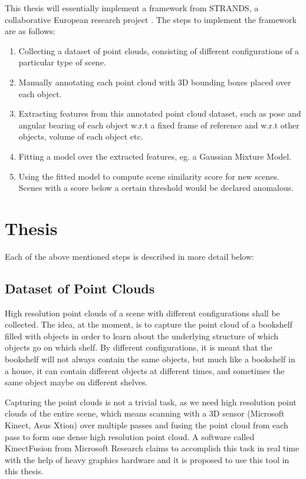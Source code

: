 \documentclass[12pt]{article}
\begin{document}
This thesis will essentially implement a framework from STRANDS, a collaborative European research project \cite{STRANDS}. The steps to implement the framework are as follows:

\begin{enumerate}
\item{Collecting a dataset of point clouds, consisting of different configurations of a particular type of scene.}
\item{Manually annotating each point cloud with 3D bounding boxes placed over each object.}
\item{Extracting features from this annotated point cloud dataset, such as pose and angular bearing of each object w.r.t a fixed frame of reference and w.r.t other objects, volume of each object etc.}
\item{Fitting a model over the extracted features, eg. a Gaussian Mixture Model.}
\item{Using the fitted model to compute scene similarity score for new scenes. Scenes with a score below a certain threshold would be declared anomalous.}
\end{enumerate}




\section{Thesis}

Each of the above mentioned steps is described in more detail below:

\subsection{Dataset of Point Clouds}

High resolution point clouds of a scene with different configurations shall be collected. The idea, at the moment, is to capture the point cloud of a bookshelf filled with objects in order to learn about the underlying structure of which objects go on which shelf. By different configurations, it is meant that the bookshelf will not always contain the same objects, but much like a bookshelf in a house, it can contain different objects at different times, and sometimes the same object maybe on different shelves.

Capturing the point clouds is not a trivial task, as we need high resolution point clouds of the entire scene, which means scanning with a 3D sensor (Microsoft Kinect, Asus Xtion) over multiple passes and fusing the point cloud from each pass to form one dense high resolution point cloud. A software called KinectFusion from Microsoft Research\cite{KinectFusion} claims to accomplish this task in real time with the help of heavy graphics hardware and it is proposed to use this tool in this thesis.
\end{document}
